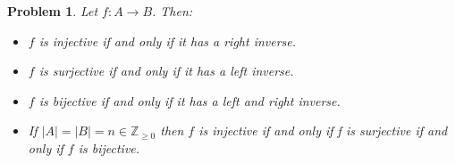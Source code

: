 \documentclass[10pt]{article}
\newcommand{\bb}[1]{\mathbb{#1}}
\theoremstyle{plain}
\newtheorem{problem}{Problem}
\theoremstyle{remark}
\begin{document}
\begin{problem}
  Let $f:A\rightarrow B$. Then:
  \begin{itemize}
  \item $f$ is injective if and only if it has a right inverse.
  \item $f$ is surjective if and only if it has a left inverse.
  \item $f$ is bijective if and only if it has a left and right inverse.
  \item If $|A|=|B|=n\in \bb{Z}_{\geq0}$ then $f$ is injective if and only if f is
    surjective if and only if $f$ is bijective.
  \end{itemize}
\end{problem}


\end{document}
